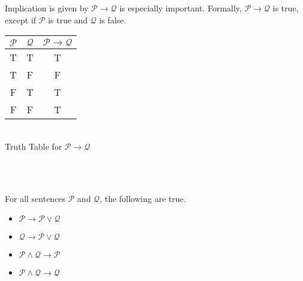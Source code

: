 \documentclass[../base/set_theory.tex]{subfiles}
\begin{document}
\\\\
Implication is given by $\mathcal{P}\to \mathcal{Q}$ is especially important.
Formally, $\mathcal{P}\to \mathcal{Q}$ is true, except if $\mathcal{P}$ is true 
and $\mathcal{Q}$ is false.\\
\begin{center}
    \begin{tabular}{c|c|c}
    $\mathcal{P}$ & $\mathcal{Q}$ & $\mathcal{P}\to \mathcal{Q}$ \\ \hline
    T & T & T \\ 
    T & F & F \\ 
    F & T & T \\  
    F & F & T \\
    \end{tabular}
    \\[10pt]
    \caption{Truth Table for $\mathcal{P}\to \mathcal{Q}$}
\end{center}
\\\\
\begin{customthm}{1.5}
    For all sentences $\mathcal{P}$ and $\mathcal{Q}$, the following are true.
    \begin{center}
    \begin{multicols}{2}
    \begin{itemize}
        \item $\mathcal{P}\to \mathcal{P}\lor \mathcal{Q}$
        \item $\mathcal{Q}\to \mathcal{P}\lor \mathcal{Q}$
        \item $\mathcal{P}\land \mathcal{Q}\to \mathcal{P}$
        \item $\mathcal{P}\land \mathcal{Q}\to \mathcal{Q}$
    \end{itemize}
    \end{multicols}
    \end{center}
\end{customthm}
\end{document}
